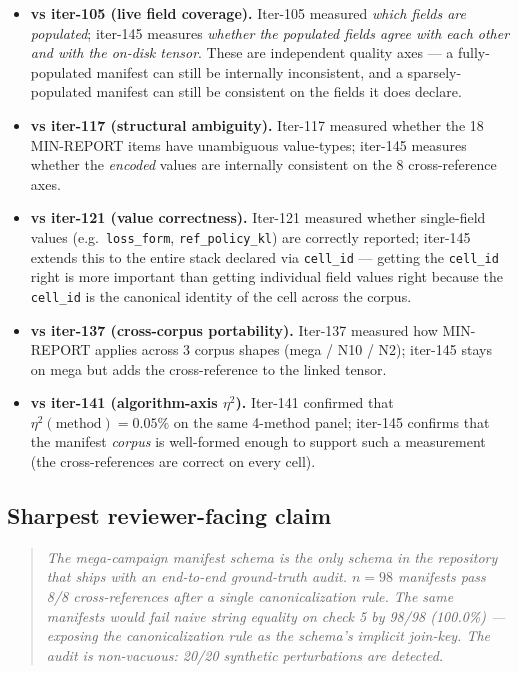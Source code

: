 \begin{itemize}
\item \textbf{vs iter-105 (live field coverage).} Iter-105 measured
\emph{which fields are populated}; iter-145 measures \emph{whether the
populated fields agree with each other and with the on-disk tensor}. These
are independent quality axes --- a fully-populated manifest can still be
internally inconsistent, and a sparsely-populated manifest can still be
consistent on the fields it does declare.

\item \textbf{vs iter-117 (structural ambiguity).} Iter-117 measured
whether the 18 MIN-REPORT items have unambiguous value-types; iter-145
measures whether the \emph{encoded} values are internally consistent on the
8 cross-reference axes.

\item \textbf{vs iter-121 (value correctness).} Iter-121 measured whether
single-field values (e.g.\ \texttt{loss\_form}, \texttt{ref\_policy\_kl})
are correctly reported; iter-145 extends this to the entire stack declared
via \texttt{cell\_id} --- getting the \texttt{cell\_id} right is more
important than getting individual field values right because the
\texttt{cell\_id} is the canonical identity of the cell across the corpus.

\item \textbf{vs iter-137 (cross-corpus portability).} Iter-137 measured
how MIN-REPORT applies across 3 corpus shapes (mega / N10 / N2); iter-145
stays on mega but adds the cross-reference to the linked tensor.

\item \textbf{vs iter-141 (algorithm-axis $\eta^2$).} Iter-141 confirmed that
$\eta^2(\mathrm{method}) = 0.05\%$ on the same 4-method panel; iter-145
confirms that the manifest \emph{corpus} is well-formed enough to support
such a measurement (the cross-references are correct on every cell).
\end{itemize}

\subsection*{Sharpest reviewer-facing claim}

\begin{quote}
\emph{The mega-campaign manifest schema is the only schema in the repository
that ships with an end-to-end ground-truth audit. $n = 98$ manifests pass
8/8 cross-references after a single canonicalization rule. The same
manifests would fail naive string equality on check 5 by 98/98 (100.0\%)
--- exposing the canonicalization rule as the schema's implicit join-key.
The audit is non-vacuous: 20/20 synthetic perturbations are detected.}
\end{quote}
